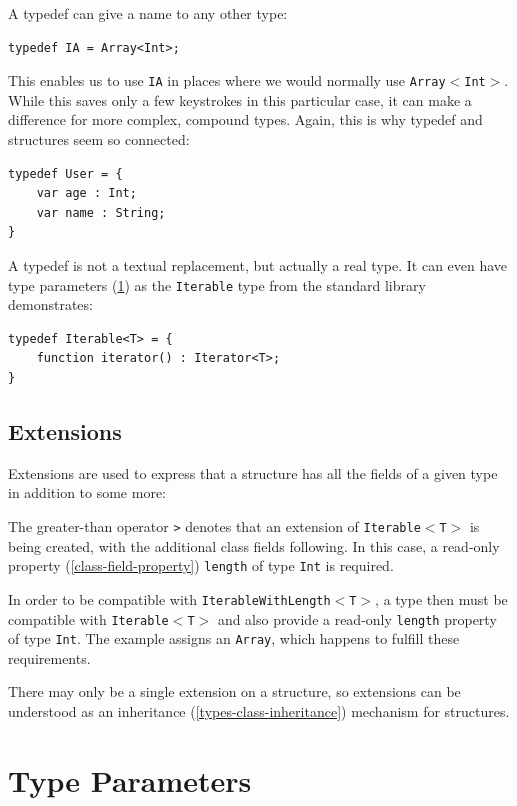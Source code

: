 \documentclass[a4paper,oneside]{book}
\newcommand{\type}[1]{\texttt{#1}}
\newcommand{\expr}[1]{\texttt{#1}}
\newcommand{\tref}[2]{#1 (\ref{#2})}
\newcommand{\haxe}[2][]{%
}
\begin{document}
A typedef can give a name to any other type:

\begin{lstlisting}
typedef IA = Array<Int>;
\end{lstlisting}
This enables us to use \expr{IA} in places where we would normally use \expr{Array$<$Int$>$}. While this saves only a few keystrokes in this particular case, it can make a difference for more complex, compound types. Again, this is why typedef and structures seem so connected:

\begin{lstlisting}
typedef User = {
    var age : Int;
    var name : String;
}
\end{lstlisting}
A typedef is not a textual replacement, but actually a real type. It can even have \tref{type parameters}{type-systemtype-parameters} as the \type{Iterable} type from the standard library demonstrates:

\begin{lstlisting}
typedef Iterable<T> = {
	function iterator() : Iterator<T>;
}
\end{lstlisting}



\subsection{Extensions}
\label{type-systemextensions}

Extensions are used to express that a structure has all the fields of a given type in addition to some more:

\haxe{assets/Extension.hx}
The greater-than operator \expr{>} denotes that an extension of \type{Iterable$<$T$>$} is being created, with the additional class fields following. In this case, a read-only \tref{property}{class-field-property} \expr{length} of type \type{Int} is required.

In order to be compatible with \type{IterableWithLength$<$T$>$}, a type then must be compatible with \type{Iterable$<$T$>$} and also provide a read-only \expr{length} property of type \type{Int}. The example assigns an \type{Array}, which happens to fulfill these requirements.

There may only be a single extension on a structure, so extensions can be understood as an \tref{inheritance}{types-class-inheritance} mechanism for structures.




\section{Type Parameters}
\label{type-systemtype-parameters}
\end{document}

